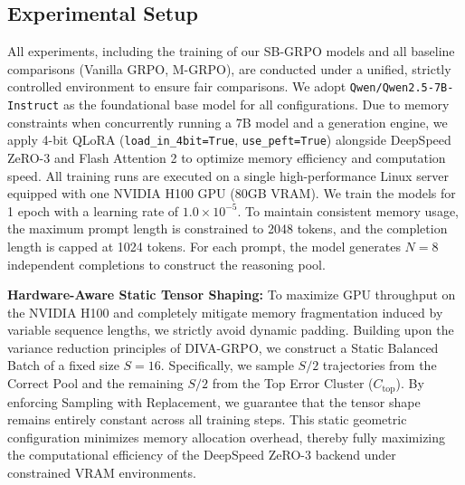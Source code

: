 \subsection{Experimental Setup}
All experiments, including the training of our SB-GRPO models and all baseline comparisons (Vanilla GRPO, M-GRPO), are conducted under a unified, strictly controlled environment to ensure fair comparisons. We adopt \texttt{Qwen/}\allowbreak\texttt{Qwen2.5-7B-Instruct} as the foundational base model for all configurations. Due to memory constraints when concurrently running a 7B model and a generation engine, we apply 4-bit QLoRA (\texttt{load\_in\_4bit=True}, \texttt{use\_peft=True}) alongside DeepSpeed ZeRO-3 and Flash Attention 2 to optimize memory efficiency and computation speed. All training runs are executed on a single high-performance Linux server equipped with one NVIDIA H100 GPU (80GB VRAM). We train the models for 1 epoch with a learning rate of $1.0 \times 10^{-5}$. To maintain consistent memory usage, the maximum prompt length is constrained to 2048 tokens, and the completion length is capped at 1024 tokens. For each prompt, the model generates $N=8$ independent completions to construct the reasoning pool.

\textbf{Hardware-Aware Static Tensor Shaping:} To maximize GPU throughput on the NVIDIA H100 and completely mitigate memory fragmentation induced by variable sequence lengths, we strictly avoid dynamic padding. Building upon the variance reduction principles of DIVA-GRPO, we construct a Static Balanced Batch of a fixed size $S = 16$. Specifically, we sample $S/2$ trajectories from the Correct Pool and the remaining $S/2$ from the Top Error Cluster ($C_{\text{top}}$). By enforcing Sampling with Replacement, we guarantee that the tensor shape remains entirely constant across all training steps. This static geometric configuration minimizes memory allocation overhead, thereby fully maximizing the computational efficiency of the DeepSpeed ZeRO-3 backend under constrained VRAM environments.